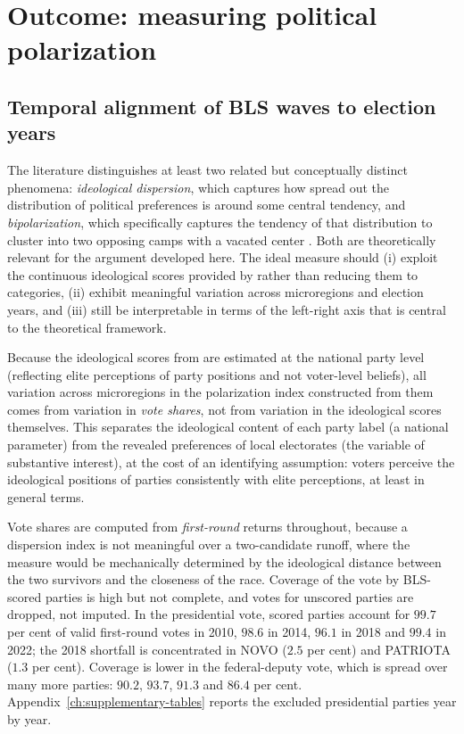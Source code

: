 \documentclass[
	11pt,				%
	oneside,			%
	a4paper,			%
	english,			%
	english				%
	]{abntex2ppgsi}
\theoremstyle{plain}
\theoremstyle{remark}
\theoremstyle{plain}%
\theoremstyle{remark}%
\begin{document}
\section{Outcome: measuring political polarization}
 
\subsection{Temporal alignment of BLS waves to election years}
\label{subsec:bls}

The literature distinguishes at least two related but conceptually
distinct phenomena: \emph{ideological dispersion}, which captures how
spread out the distribution of political preferences is around some
central tendency, and \emph{bipolarization}, which specifically captures
the tendency of that distribution to cluster into two opposing camps with
a vacated center \cite{esteban,duclos}.
Both are theoretically relevant for the argument developed here.
The ideal measure should (i) exploit the continuous ideological scores
provided by  rather than reducing them to categories,
(ii) exhibit meaningful variation across microregions and election years, and (iii) still be interpretable 
in terms of the left-right axis that is central to the theoretical framework.
 
Because the ideological scores from  are estimated
at the national party level (reflecting elite perceptions of party
positions and not voter-level beliefs), all variation across microregions
in the polarization index constructed from them comes from variation in
\emph{vote shares}, not from variation in the ideological scores themselves.
This separates the ideological content of each party label (a national
parameter) from the revealed preferences of local electorates (the
variable of substantive interest), at the cost of an identifying assumption:
voters perceive the ideological positions of parties consistently with
elite perceptions, at least in general terms.

Vote
shares are computed from \emph{first-round} returns throughout, because a
dispersion index is not meaningful over a two-candidate runoff, where the
measure would be mechanically determined by the ideological distance between the
two survivors and the closeness of the race. Coverage of the vote
by BLS-scored parties is high but not complete, and votes for unscored parties
are dropped, not imputed. In the presidential vote, scored parties account for
$99.7$ per cent of valid first-round votes in 2010, $98.6$ in 2014, $96.1$ in
2018 and $99.4$ in 2022; the 2018 shortfall is concentrated in NOVO ($2.5$ per cent)
and PATRIOTA ($1.3$ per cent). Coverage is lower in the federal-deputy vote, which
is spread over many more parties: $90.2$, $93.7$, $91.3$ and $86.4$ per cent.
Appendix~\ref{ch:supplementary-tables} reports the excluded presidential parties year by year.
\end{document}
